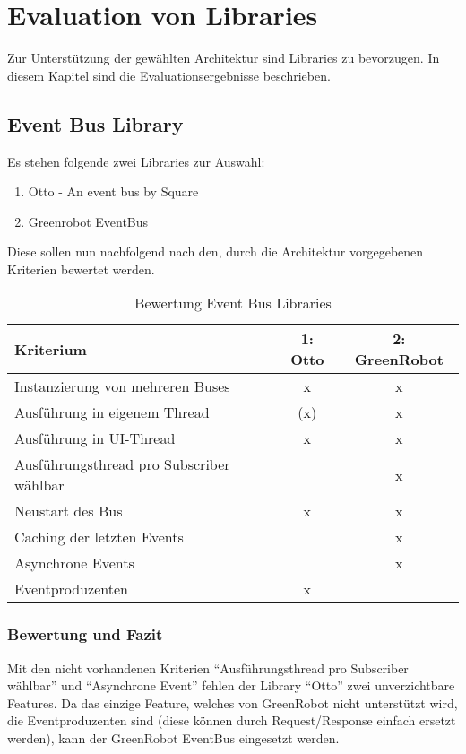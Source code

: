 \section{Evaluation von Libraries}
\label{sec:Evaluation von Libraries}
Zur Unterstützung der gewählten Architektur sind Libraries zu bevorzugen. In diesem Kapitel sind die Evaluationsergebnisse beschrieben.

\subsection{Event Bus Library}
Es stehen folgende zwei Libraries zur Auswahl:
\begin{enumerate}
\item Otto - An event bus by Square
\item Greenrobot EventBus
\end{enumerate}
Diese sollen nun nachfolgend nach den, durch die Architektur vorgegebenen Kriterien bewertet werden.

\begin{table}[H]
\begin{tabular}{|p{8cm}|c|c|}
 \hline 
\textbf{Kriterium} & \textbf{1: Otto} & \textbf{2: GreenRobot} 
\\ \hline

Instanzierung von mehreren Buses & x & x
\\ \hline

Ausführung in eigenem Thread & (x) & x
\\ \hline

Ausführung in \ac{UI}-Thread & x & x
\\ \hline

Ausführungsthread pro Subscriber wählbar &   & x
\\ \hline

Neustart des Bus & x & x
\\ \hline

Caching der letzten Events &   & x
\\ \hline

Asynchrone Events &   & x
\\ \hline

Eventproduzenten & x & 
\\ \hline

\end{tabular}
\caption{Bewertung Event Bus Libraries}
\end{table}

\subsubsection{Bewertung und Fazit}
Mit den nicht vorhandenen Kriterien \enquote{Ausführungsthread pro Subscriber wählbar} und \enquote{Asynchrone Event} fehlen der Library \enquote{Otto} zwei unverzichtbare Features. Da das einzige Feature, welches von GreenRobot nicht unterstützt wird, die Eventproduzenten sind (diese können durch Request/Response einfach ersetzt werden), kann der GreenRobot EventBus eingesetzt werden.

